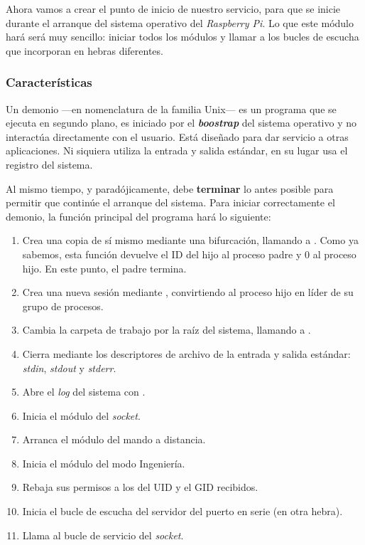 Ahora vamos a crear el punto de inicio de nuestro servicio, para que se inicie durante el arranque del sistema operativo del \textit{Raspberry Pi}. Lo que este módulo hará será muy sencillo: iniciar todos los módulos y llamar a los bucles de escucha que incorporan en hebras diferentes.

\subsubsection{Características}

Un demonio ---en nomenclatura de la familia Unix--- es un programa que se ejecuta en segundo plano, es iniciado por el \textbf{\textit{boostrap}} del sistema operativo y no interactúa directamente con el usuario. Está diseñado para dar servicio a otras aplicaciones. Ni siquiera utiliza la entrada y salida estándar, en su lugar usa el registro del sistema.

Al mismo tiempo, y paradójicamente, debe \textbf{terminar} lo antes posible para permitir que continúe el arranque del sistema. Para iniciar correctamente el demonio, la función principal del programa hará lo siguiente: \cite{shahmir_daemon}

\begin{enumerate}
	\item Crea una copia de sí mismo mediante una bifurcación, llamando a . Como ya sabemos, esta función devuelve el ID del hijo al proceso padre y 0 al proceso hijo. En este punto, el padre termina.
	
	\item Crea una nueva sesión mediante , convirtiendo al proceso hijo en líder de su grupo de procesos.
	
	\item Cambia la carpeta de trabajo por la raíz del sistema, llamando a .
	
	\item Cierra mediante  los descriptores de archivo de la entrada y salida estándar: \textit{stdin}, \textit{stdout} y \textit{stderr}.
	
	\item Abre el \textit{log} del sistema con .
	
	\item Inicia el módulo del \textit{socket}.
	
	\item Arranca el módulo del mando a distancia.
	
	\item Inicia el módulo del modo Ingeniería.
	
	\item Rebaja sus permisos a los del \acrshort{UID} y el \acrshort{GID} recibidos.
	
	\item Inicia el bucle de escucha del servidor del puerto en serie (en otra hebra).
	
	\item Llama al bucle de servicio del \textit{socket}.
	
\end{enumerate}

